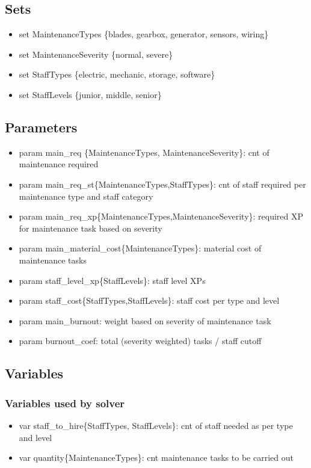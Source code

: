     \subsection{Sets}
      \begin{itemize}
        \item set MaintenanceTypes \{blades, gearbox, generator, sensors, wiring\}
        \item set MaintenanceSeverity \{normal, severe\}
        \item set StaffTypes \{electric, mechanic, storage, software\}
        \item set StaffLevels \{junior, middle, senior\}
      \end{itemize}

    \subsection{Parameters}
      \begin{itemize}
        \item param main\_req \{MaintenanceTypes, MaintenanceSeverity\}: cnt of maintenance required
        \item param main\_req\_st\{MaintenanceTypes,StaffTypes\}: cnt of staff required per maintenance type and staff category
        \item param main\_req\_xp\{MaintenanceTypes,MaintenanceSeverity\}: required XP for maintenance task based on severity
        \item param main\_material\_cost\{MaintenanceTypes\}: material cost of maintenance tasks
        \item param staff\_level\_xp\{StaffLevels\}: staff level XPs
        \item param staff\_cost\{StaffTypes,StaffLevels\}: staff cost per type and level
        \item param main\_burnout: weight based on severity of maintenance task
        \item param burnout\_coef: total (severity weighted) tasks / staff cutoff
      \end{itemize}

    \subsection{Variables}
      \subsubsection{Variables used by solver}
        \begin{itemize}
          \item var staff\_to\_hire\{StaffTypes, StaffLevels\}: cnt of staff needed as per type and level
          \item var quantity\{MaintenanceTypes\}: cnt maintenance tasks to be carried out
        \end{itemize}

